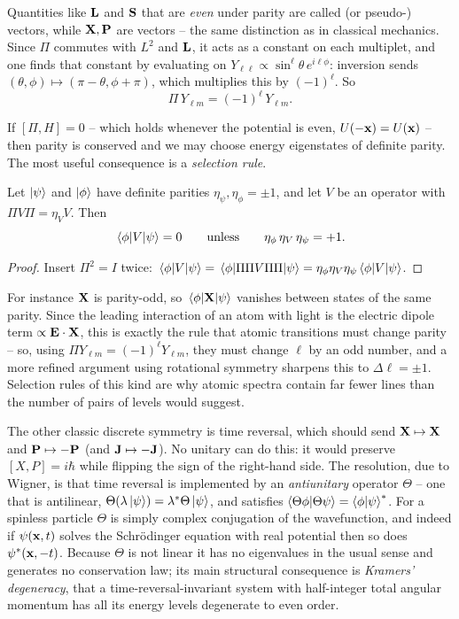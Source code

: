 \documentclass[a4paper]{scrartcl}
\begin{document}
Quantities like $\mathbf{L}$ and $\mathbf{S}$ that are \emph{even} under parity are called  (or pseudo-) vectors, while $\mathbf{X}, \mathbf{P}$ are  vectors -- the same distinction as in classical mechanics. Since $\Pi$ commutes with $L^2$ and $\mathbf{L}$, it acts as a constant on each multiplet, and one finds that constant by evaluating on $Y_{\ell\ell}\propto \sin^\ell\theta\, e^{i\ell\phi}$: inversion sends $(\theta,\phi)\mapsto(\pi-\theta,\phi+\pi)$, which multiplies this by $(-1)^\ell$. So
$$
\Pi \, Y_{\ell m} = (-1)^\ell \, Y_{\ell m}.
$$

If $[\Pi, H] = 0$ -- which holds whenever the potential is even, $U(-\mathbf{x}) = U(\mathbf{x})$ -- then parity is conserved and we may choose energy eigenstates of definite parity. The most useful consequence is a \emph{selection rule}.

\begin{proposition}
    Let $\ket\psi$ and $\ket\phi$ have definite parities $\eta_\psi, \eta_\phi = \pm1$, and let $V$ be an operator with $\Pi V \Pi = \eta_V V$. Then
    $$
    \mel{\phi}{V}{\psi} = 0 \qquad \text{unless} \qquad \eta_\phi\, \eta_V\, \eta_\psi = +1.
    $$
\end{proposition}
\begin{proof}
    Insert $\Pi^2 = I$ twice: $\mel{\phi}{V}{\psi} = \mel{\phi}{\Pi \Pi V \Pi \Pi}{\psi} = \eta_\phi \eta_V \eta_\psi \mel{\phi}{V}{\psi}$.
\end{proof}

For instance $\mathbf{X}$ is parity-odd, so $\mel{\phi}{\mathbf{X}}{\psi}$ vanishes between states of the same parity. Since the leading interaction of an atom with light is the electric dipole term $\propto \mathbf{E} \cdot \mathbf{X}$, this is exactly the rule that atomic transitions must change parity -- so, using $\Pi Y_{\ell m} = (-1)^\ell Y_{\ell m}$, they must change $\ell$ by an odd number, and a more refined argument using rotational symmetry sharpens this to $\Delta \ell = \pm1$. Selection rules of this kind are why atomic spectra contain far fewer lines than the number of pairs of levels would suggest.

\begin{remark}
    The other classic discrete symmetry is time reversal, which should send $\mathbf{X} \mapsto \mathbf{X}$ and $\mathbf{P} \mapsto -\mathbf{P}$ (and $\mathbf{J} \mapsto -\mathbf{J}$). No unitary can do this: it would preserve $[X,P] = i\hbar$ while flipping the sign of the right-hand side. The resolution, due to Wigner, is that time reversal is implemented by an \emph{antiunitary} operator $\Theta$ -- one that is antilinear, $\Theta(\lambda\ket\psi) = \lambda^*\Theta\ket\psi$, and satisfies $\braket{\Theta\phi}{\Theta\psi} = \braket{\phi}{\psi}^*$. For a spinless particle $\Theta$ is simply complex conjugation of the wavefunction, and indeed if $\psi(\mathbf{x}, t)$ solves the Schr\"odinger equation with real potential then so does $\psi^*(\mathbf{x}, -t)$. Because $\Theta$ is not linear it has no eigenvalues in the usual sense and generates no conservation law; its main structural consequence is \emph{Kramers' degeneracy}, that a time-reversal-invariant system with half-integer total angular momentum has all its energy levels degenerate to even order.
\end{remark}
\end{document}
